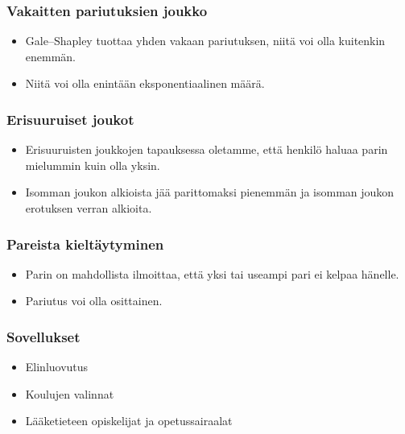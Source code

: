 \documentclass{beamer}
\begin{document}
  \begin{frame}
  	\frametitle{Vakaitten pariutuksien joukko}
  	\begin{itemize}
  		\item Gale--Shapley tuottaa yhden vakaan pariutuksen, niitä voi olla kuitenkin enemmän.
  		\item Niitä voi olla enintään eksponentiaalinen määrä.
  	\end{itemize}
  \end{frame}
  \begin{frame}
  	\frametitle{Erisuuruiset joukot}
  	\begin{itemize}
  		\item Erisuuruisten joukkojen tapauksessa oletamme, että henkilö haluaa parin mielummin kuin olla yksin.
  		\item Isomman joukon alkioista jää parittomaksi pienemmän ja isomman joukon erotuksen verran alkioita.	
  	\end{itemize}
  \end{frame}
  \begin{frame}
  	\frametitle{Pareista kieltäytyminen}
  	\begin{itemize}
  		\item Parin on mahdollista ilmoittaa, että yksi tai useampi pari ei kelpaa hänelle.
  		\item Pariutus voi olla osittainen.
  	\end{itemize}
  \end{frame}
  \begin{frame}
  	\frametitle{Sovellukset}
  	\begin{itemize}
  		\item Elinluovutus
  		\item Koulujen valinnat
  		\item Lääketieteen opiskelijat ja opetussairaalat
  	\end{itemize}
  \end{frame}
\end{document}
